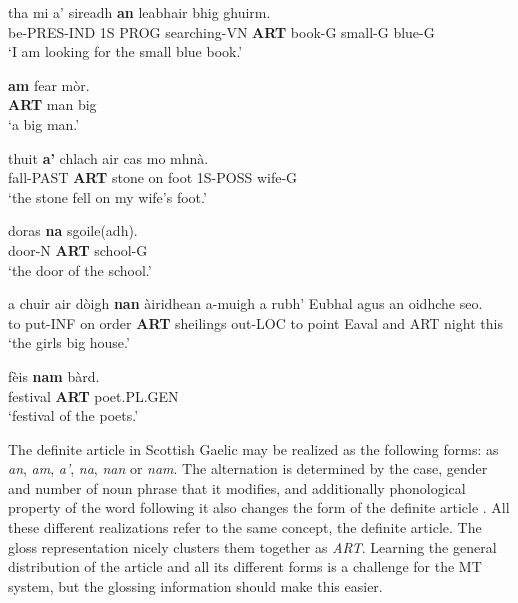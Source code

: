 \documentclass[a4paper]{article}
\begin{document}
\begin{exe}  
\ex 
\gll tha mi a' sireadh \textbf{an} leabhair bhig ghuirm.\\
be-PRES-IND 1S PROG searching-VN \textbf{ART} book-G small-G blue-G\\
\glt `I am looking for the small blue book.' \citep[p. 29]{lamb2001scottish}

\ex 
\gll \textbf{am} fear m\`or.\\
\textbf{ART} man big\\
\glt `a big man.' \citep[p. 31]{lamb2001scottish}

\ex
\gll thuit \textbf{a'} chlach air cas mo mhn\`a.\\
fall-PAST \textbf{ART} stone on foot 1S-POSS wife-G\\
\glt`the stone fell on my wife's foot.' \citep[p. 30]{lamb2001scottish} 	

\ex
\gll doras \textbf{na} sgoile(adh). \\
door-N \textbf{ART} school-G \\
\glt `the door of the school.' \citep[p. 29]{lamb2001scottish} 	

\ex 
\gll a chuir air d\`oigh \textbf{nan} \`airidhean a-muigh a rubh' Eubhal agus an oidhche seo. \\
to put-INF on order \textbf{ART} sheilings out-LOC to point Eaval and ART night this \\
\glt `the girls big house.' \citep[p. 100]{lamb2001scottish} 

\ex
\gll f\`eis \textbf{nam} b\`ard.\\
festival \textbf{ART} poet.PL.GEN\\
\glt `festival of the poets.' \citep[p. 107]{lamb2001scottish}

\end{exe}

The definite article in Scottish Gaelic may be realized as the following forms: as \textit{an}, \textit{am}, \textit{a'}, \textit{na}, \textit{nan} or \textit{nam}. The alternation is determined by the case, gender and number of noun phrase that it modifies, and additionally phonological property of the word following it also changes the form of the definite article \citep{lamb2001scottish}. All these different realizations refer to the same concept, the definite article. The gloss representation nicely clusters them together as \textit{ART}. Learning the general distribution of the article and all its different forms is a challenge for the MT system, but the glossing information should make this easier.
\end{document}
